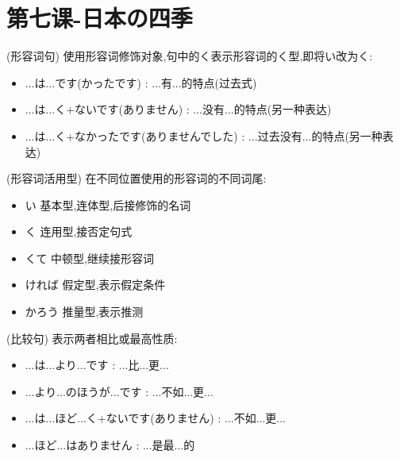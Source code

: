 
\usepackage{../../lectures_preamble}


    \section{第七课-日本の四季}
    \begin{definition}
        (形容词句) 使用形容词修饰对象,句中的く表示形容词的く型,即将い改为く:
        \begin{itemize}
            \item ...は...です(かったです) : ...有...的特点(过去式)
            \item ...は...く+ないです(ありません) : ...没有...的特点(另一种表达)
            \item ...は...く+なかったです(ありませんでした) : ...过去没有...的特点(另一种表达)
        \end{itemize}
    \end{definition}
    \begin{definition}
        (形容词活用型) 在不同位置使用的形容词的不同词尾:
        \begin{itemize}
            \item い 基本型,连体型,后接修饰的名词
            \item く 连用型,接否定句式
            \item くて 中顿型,继续接形容词
            \item ければ 假定型,表示假定条件
            \item かろう 推量型,表示推测
        \end{itemize}
    \end{definition}
    \begin{definition}
        (比较句) 表示两者相比或最高性质:
        \begin{itemize}
            \item ...は...より...です : ...比...更...
            \item ...より...のほうが...です : ...不如...更...
            \item ...は...ほど...く+ないです(ありません) : ...不如...更...
            \item ...ほど...はありません : ...是最...的
        \end{itemize}
    \end{definition}
